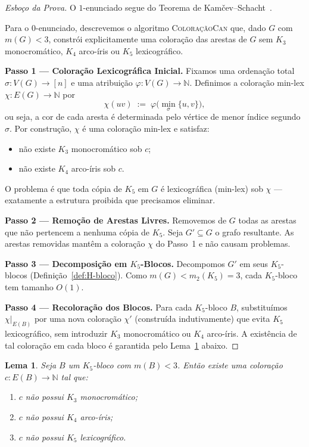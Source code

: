 \documentclass[reqno, 12pt]{amsart}
\numberwithin{equation}{section}
\theoremstyle{plain}
\newtheorem{lemma}[theorem]{Lema}
\theoremstyle{definition}
\newcommand{\mdens}{m_2}
\newcommand{\maxdens}{m}
\begin{document}
\begin{proof}[Esboço da Prova]
  O $1$-enunciado segue do Teorema de Kam\v{c}ev--Schacht~\cite{kamcev2023canonical}.

  Para o $0$-enunciado, descrevemos o algoritmo \textsc{ColoraçãoCan} que, dado $G$ com $\maxdens(G) < 3$, constrói explicitamente uma coloração das arestas de $G$ sem $K_3$ monocromático, $K_4$ arco-íris ou $K_5$ lexicográfico.

  \textbf{Passo 1 --- Coloração Lexicográfica Inicial.}
  Fixamos uma ordenação total $\sigma: V(G) \to [n]$ e uma atribuição $\varphi: V(G) \to \mathbb{N}$.
  Definimos a coloração min-lex $\chi: E(G) \to \mathbb{N}$ por
  \[ \chi(uv) \;:=\; \varphi\!\bigl(\min_\sigma\{u,v\}\bigr), \]
  ou seja, a cor de cada aresta é determinada pelo vértice de menor índice segundo $\sigma$.
  Por construção, $\chi$ é uma coloração min-lex e satisfaz:
  \begin{itemize}
    \item não existe $K_3$ monocromático sob $c$;
    \item não existe $K_4$ arco-íris sob $c$.
  \end{itemize}
  O problema é que toda cópia de $K_5$ em $G$ é lexicográfica (min-lex) sob $\chi$ --- exatamente a estrutura proibida que precisamos eliminar.

  \textbf{Passo 2 --- Remoção de Arestas Livres.}
  Removemos de $G$ todas as arestas que não pertencem a nenhuma cópia de $K_5$.
  Seja $G' \subseteq G$ o grafo resultante. As arestas removidas mantêm a coloração $\chi$ do Passo~1 e não causam problemas.

  \textbf{Passo 3 --- Decomposição em $K_5$-Blocos.}
  Decompomos $G'$ em seus $K_5$-blocos (Definição~\ref{def:H-bloco}).
  Como $\maxdens(G) < \mdens(K_5) = 3$, cada $K_5$-bloco tem tamanho $O(1)$.

  \textbf{Passo 4 --- Recoloração dos Blocos.}
  Para cada $K_5$-bloco $B$, substituímos $\chi|_{E(B)}$ por uma nova coloração $\chi'$ (construída indutivamente) que evita $K_5$ lexicográfico, sem introduzir $K_3$ monocromático ou $K_4$ arco-íris.
  A existência de tal coloração em cada bloco é garantida pelo Lema~\ref{lem:0-statement-K5} abaixo.
\end{proof}

\begin{lemma}
  \label{lem:0-statement-K5}
  Seja $B$ um $K_5$-bloco com $\maxdens(B) < 3$. Então existe uma coloração $c: E(B) \to \mathbb{N}$ tal que:
  \begin{enumerate}
    \item[(i)] $c$ não possui $K_3$ monocromático;
    \item[(ii)] $c$ não possui $K_4$ arco-íris;
    \item[(iii)] $c$ não possui $K_5$ lexicográfico.
  \end{enumerate}
\end{lemma}
\end{document}
